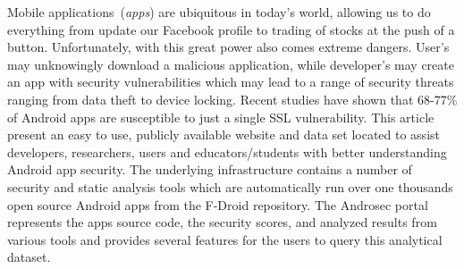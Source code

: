 Mobile applications~(\emph{apps}) are ubiquitous in today's world, allowing us to do everything from update our Facebook profile to trading of stocks at the push of a button. Unfortunately, with this great power also comes extreme dangers. User's may unknowingly download a malicious application, while developer's may create an app with security vulnerabilities which may lead to a range of security threats ranging from data theft to device locking. Recent studies have shown that 68-77\% of Android apps are susceptible to just a single SSL vulnerability.
This article present an easy to use, publicly available website and data set located to assist developers, researchers, users and educators/students with better understanding Android app security. The underlying infrastructure contains a number of security and static analysis tools which are automatically run over one thousands open source Android apps from the F-Droid repository. The Androsec portal represents the apps source code, the security scores, and analyzed results from various tools and provides several features for the users to query this analytical dataset.












